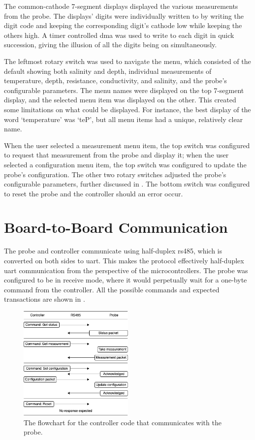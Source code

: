 The common-cathode 7-segment displays displayed the various measurements from the probe.
The displays' digits were individually written to by writing the digit code and keeping the corresponding digit's cathode low while keeping the others high.
A timer controlled \gls{dma} was used to write to each digit in quick succession, giving the illusion of all the digits being on simultaneously.

The leftmost rotary switch was used to navigate the menu, which consisted of the default showing both salinity and depth, individual measurements of temperature, depth, resistance, conductivity, and salinity, and the probe's configurable parameters.
The menu names were displayed on the top 7-segment display, and the selected menu item was displayed on the other.
This created some limitations on what could be displayed. 
For instance, the best display of the word `temperature' was `teP', but all menu items had a unique, relatively clear name.

When the user selected a measurement menu item, the top switch was configured to request that measurement from the probe and display it; when the user selected a configuration menu item, the top switch was configured to update the probe's configuration.
The other two rotary switches adjusted the probe's configurable parameters, further discussed in .
The bottom switch was configured to reset the probe and the controller should an error occur.

\section{Board-to-Board Communication}\label{sec:board-to-board-communication}

The probe and controller communicate using half-duplex \gls{rs485}, which is converted on both sides to \gls{uart}.
This makes the protocol effectively half-duplex \gls{uart} communication from the perspective of the microcontrollers.
The probe was configured to be in receive mode, where it would perpetually wait for a one-byte command from the controller.
All the possible commands and expected transactions are shown in .

\begin{figure}[ht]
    \centering
    \includegraphics[width=0.5\textwidth]{Figures/rs485_flowchart}
    \caption{The flowchart for the controller code that communicates with the probe.}
    \label{fig:rs485-flowchart} %
\end{figure}


